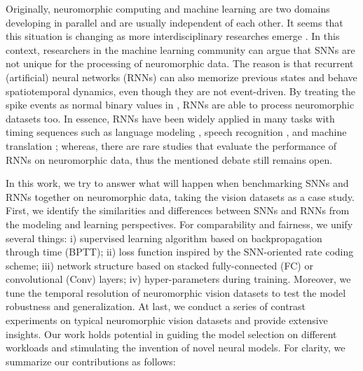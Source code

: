 \documentclass[journal,10pt,twocolumn]{IEEETran}
\begin{document}
Originally, neuromorphic computing and machine learning are two domains developing in parallel and are usually independent of each other. It seems that this situation is changing as more interdisciplinary researches emerge \cite{pei2019towards,deng2020tianjic,deng2020rethinking}. In this context, researchers in the machine learning community can argue that SNNs are not unique for the processing of neuromorphic data. The reason is that recurrent (artificial) neural networks (RNNs) can also memorize previous states and behave spatiotemporal dynamics, even though they are not event-driven. By treating the spike events as normal binary values in , RNNs are able to process neuromorphic datasets too. In essence, RNNs have been widely applied in many tasks with timing sequences such as language modeling \cite{mikolov2012statistical}, speech recognition \cite{miao2015eesen}, and machine translation \cite{cho2014learning}; whereas, there are rare studies that evaluate the performance of RNNs on neuromorphic data, thus the mentioned debate still remains open. 

In this work, we try to answer what will happen when benchmarking SNNs and RNNs together on neuromorphic data, taking the vision datasets as a case study. First, we identify the similarities and differences between SNNs and RNNs from the modeling and learning perspectives. For comparability and fairness, we unify several things: i) supervised learning algorithm based on backpropagation through time (BPTT); ii) loss function inspired by the SNN-oriented rate coding scheme; iii) network structure based on stacked fully-connected (FC) or convolutional (Conv) layers; iv) hyper-parameters during training. Moreover, we tune the temporal resolution of neuromorphic vision datasets to test the model robustness and generalization. At last, we conduct a series of contrast experiments on typical neuromorphic vision datasets and provide extensive insights. Our work holds potential in guiding the model selection on different workloads and stimulating the invention of novel neural models. For clarity, we summarize our contributions as follows:
\end{document}
